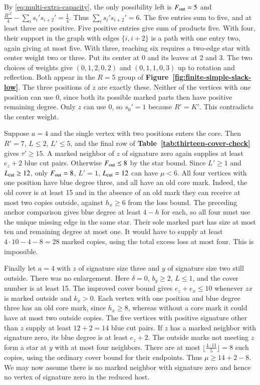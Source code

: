 By \eqref{eq:multi-extra-capacity}, the only possibility left is
$F_{\rm out}=5$ and
$\frac{R'^2}{4}-\sum_i s_i's_{i+2}'=\frac{1}{4}$. Thus $\sum_i s_i's_{i+2}'=6$.
The five entries sum to five, and at least three are positive.
Five positive entries give sum of products five. With four, their
support in the graph with edges $\{i,i+2\}$ is a path with one entry
two, again giving at most five. With three, reaching six requires a
two-edge star with center weight two or three. Put its center at 0
and its leaves at 2 and 3. The two choices of weights give
$(0,1,2,0,2)$ and $(0,1,1,0,3)$ up to rotation and reflection. Both
appear in the $R=5$ group of \textbf{Figure~\ref{fig:finite-simple-slack-low}}.
The three positions of $z$ are exactly
these. Neither of the vertices with one position can use 0, since
both its possible marked parts then have positive remaining degree.
Only $z$ can use 0, so $s_0'=1$ because $R'=K'$. This contradicts
the center weight.

Suppose $a=4$ and the single vertex with two positions enters the
core. Then $R'=7$, $L\le2$, $L'\le5$, and the final row of
\textbf{Table~\ref{tab:thirteen-cover-check}} gives $\tau'\ge15$. A marked neighbor of $z$ of signature
zero again supplies at least $e_z+2$ blue cut pairs. Otherwise
$F_{\rm out}\le8$ by the star bound. Since $L'\ge1$ and
$L_{\rm cut}\ge12$, only $F_{\rm out}=8$, $L'=1$, $L_{\rm cut}=12$
can have $\mu<6$. All four vertices with one position have blue
degree three, and all have an old core mark. Indeed, the old cover
is at least 15 and in the absence of an old mark they can receive
at most two copies outside, against $h_x\ge6$ from the loss bound.
The preceding anchor comparison gives blue degree at least $4-h$
for each, so all four must use the unique missing edge in the same
star. Their sole marked part has size at most ten and remaining degree
at most one. It would have to supply at least $4\cdot10-4-8=28$
marked copies, using the total excess loss at most four. This is
impossible.

Finally let $a=4$ with $z$ of signature size three and $y$ of
signature size two still outside. There was no enlargement. Here
$\delta=0$, $b_y\ge2$, $L\le1$, and the cover number is at least
15. The improved cover bound gives $e_z+e_x\le10$ whenever $zx$
is marked outside and $k_x>0$. Each vertex with one position and
blue degree three has an old core mark, since $h_x\ge8$, whereas
without a core mark it could have at most two outside copies.
The five vertices with positive signature other than $z$ supply
at least $12+2=14$ blue cut pairs. If $z$ has a marked neighbor with
signature zero, its blue degree is at least $e_z+2$. The outside
marks not meeting $z$ form a star at $y$ with at most four neighbors.
There are at most $\lfloor\frac{4\cdot11}{5}\rfloor=8$ such copies, using
the ordinary cover bound for their endpoints. Thus $\mu\ge14+2-8$.
We may now assume there is no marked neighbor with signature zero and
hence no vertex of signature zero in the reduced host.

